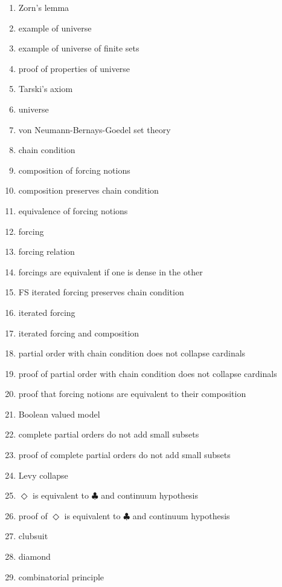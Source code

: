 \documentclass[12pt]{article}
\begin{document}
\begin{multicols}{2}
\begin{enumerate}
\item Zorn's lemma
\item example of universe 
\item example of universe of finite sets
\item proof of properties of universe
\item Tarski's axiom
\item universe
\item von Neumann-Bernays-Goedel set theory
\item chain condition 
\item composition of forcing notions
\item composition preserves chain condition
\item equivalence of forcing notions
\item forcing
\item forcing relation
\item forcings are equivalent if one is dense in the other
\item FS iterated forcing preserves chain condition
\item iterated forcing
\item iterated forcing and composition
\item partial order with chain condition does not collapse cardinals
\item proof of partial order with chain condition does not collapse cardinals 
\item proof that forcing notions are equivalent to their composition
\item Boolean valued model
\item complete partial orders do not add small subsets
\item proof of complete partial orders do not add small subsets
\item Levy collapse
\item $\Diamond$ is equivalent to $\clubsuit$ and continuum hypothesis
\item proof of $\Diamond$ is equivalent to $\clubsuit$ and continuum hypothesis
\item clubsuit
\item diamond
\item combinatorial principle
\end{enumerate}

\end{multicols}
\end{document}
